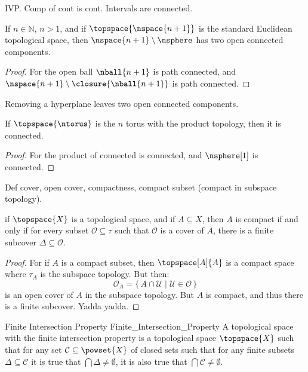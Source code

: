 \documentclass{article}                                                        %
\begin{document}
        IVP. Comp of cont is cont. Intervals are connected.
        \begin{theorem}
            If $n\in\mathbb{N}$, $n>1$, and if $\topspace{\nspace{n+1}}$ is the
            standard Euclidean topological space, then
            $\nspace{n+1}\setminus\nsphere$ has two open connected components.
        \end{theorem}
        \begin{proof}
            For the open ball $\nball{n+1}$ is path connected, and
            $\nspace{n+1}\setminus\closure{\nball{n+1}}$ is path connected.
        \end{proof}
        Removing a hyperplane leaves two open connected components.
        \begin{theorem}
            If $\topspace{\ntorus}$ is the $n$ torus with the product topology,
            then it is connected.
        \end{theorem}
        \begin{proof}
            For the product of connected is connected, and $\nsphere[1]$ is
            connected.
        \end{proof}
        Def cover, open cover, compactness, compact subset
        (compact in subspace topology).
        \begin{theorem}
            if $\topspace{X}$ is a topological space, and if $A\subseteq{X}$,
            then $A$ is compact if and only if for every subset
            $\mathcal{O}\subseteq\tau$ such that $\mathcal{O}$ is a cover of
            $A$, there is a finite subcover $\Delta\subseteq\mathcal{O}$.
        \end{theorem}
        \begin{proof}
            For if $A$ is a compact subset, then $\topspace[A]{A}$ is a compact
            space where $\tau_{A}$ is the subspace topology. But then:
            \begin{equation}
                \mathcal{O}_{A}=\{\,A\cap\mathcal{U}\;|\;
                    \mathcal{U}\in\mathcal{O}\,\}
            \end{equation}
            is an open cover of $A$ in the subspace topology. But $A$ is
            compact, and thus there is a finite subcover. Yadda yadda.
        \end{proof}
        \begin{fdefinition}{Finite Intersection Property}
                           {Finite_Intersection_Property}
            A topological space with the finite intersection property is a
            topological space $\topspace{X}$ such that for any set
            $\mathcal{C}\subseteq\powset{X}$ of closed sets such that for any
            finite subsets $\Delta\subseteq\mathcal{C}$ it is true that
            $\bigcap\Delta\ne\emptyset$, it is also true that
            $\bigcap\mathcal{C}\ne\emptyset$.
        \end{fdefinition}
\end{document}
